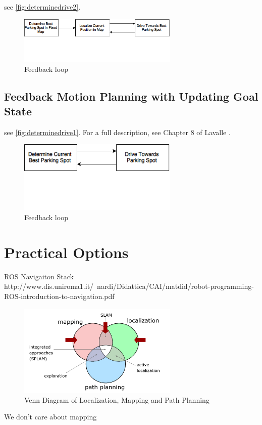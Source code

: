 see \autoref{fig:determinedrive2}.
\begin{figure}
\centering
\includegraphics[width=3in]{figures/determinedrive2.png}
\caption{Feedback loop}
\label{fig:determinedrive2}
\end{figure}


\subsection{Feedback Motion Planning with Updating Goal State}
see \autoref{fig:determinedrive1}.
For a full description, see Chapter 8 of Lavalle \cite{lavalle2006planning}.

\begin{figure}
\centering
\includegraphics[width=3in]{figures/determinedrive1.png}
\caption{Feedback loop}
\label{fig:determinedrive1}
\end{figure}

\section{Practical Options}
ROS Navigaiton Stack
http://www.dis.uniroma1.it/~nardi/Didattica/CAI/matdid/robot-programming-ROS-introduction-to-navigation.pdf

\begin{figure}
\centering
\includegraphics[width=3in]{figures/mappinglocalizationpathplanningvenndiagram.png}
\caption{Venn Diagram of Localization, Mapping and Path Planning}
\label{fig:mappinglocalizationpathplanningvenndiagram}
\end{figure}

We don't care about mapping
